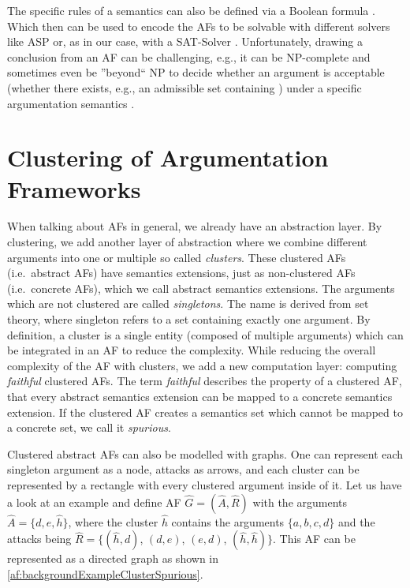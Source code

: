 The specific rules of a semantics can also be defined via a Boolean formula \cite{inproceedingsBesnardDoutreBooleanFormulaSemantics}. Which then can be used to encode the AFs to be solvable with different solvers like \ac{ASP} \cite{DBLP:journals/corr/abs-1301-1388} or, as in our case, with a \ac{SAT-Solver} \cite{DBLP:journals/amai/AmgoudD13}. Unfortunately, drawing a conclusion from an AF can be challenging, e.g., it can be NP-complete and sometimes even be ''beyond`` NP to decide whether an argument is acceptable (whether there exists, e.g., an admissible set containing ) under a specific argumentation semantics \cite{DBLP:journals/ai/DvorakGRW23}.



\section{Clustering of Argumentation Frameworks}
\label{sec:ClusteringOfArgumentationFrameworks}

When talking about AFs in general, we already have an abstraction layer. By clustering, we add another layer of abstraction where we combine different arguments into one or multiple so called \emph{clusters}. These clustered AFs (i.e.\ abstract AFs) have semantics extensions, just as non-clustered AFs (i.e.\ concrete AFs), which we call abstract semantics extensions. The arguments which are not clustered are called \emph{singletons}. The name is derived from set theory, where singleton refers to a set containing exactly one argument.
By definition, a cluster is a single entity (composed of multiple arguments) which can be integrated in an AF to reduce the complexity. While reducing the overall complexity of the AF with clusters, we add a new computation layer: computing \emph{faithful} clustered AFs. The term \emph{faithful} describes the property of a clustered AF, that every abstract semantics extension can be mapped to a concrete semantics extension. If the clustered AF creates a semantics set which cannot be mapped to a concrete set, we call it \emph{spurious}.

Clustered abstract AFs can also be modelled with graphs. One can represent each singleton argument as a node, attacks as arrows, and each cluster can be represented by a rectangle with every clustered argument inside of it. Let us have a look at an example and define AF $\hat{G}=(\hat{A}, \hat{R})$ with the arguments $\hat{A}=\{d, e, \hat{h}\}$, where the cluster $\hat{h}$ contains the arguments $\{a, b, c, d\}$ and the attacks being $\hat{R}=\bigl\{(\hat{h}, d)$, $(d, e)$, $(e, d)$, $(\hat{h},\hat{h})\bigl\}$.  This AF can be represented as a directed graph as shown in \cref{af:backgroundExampleClusterSpurious}.


